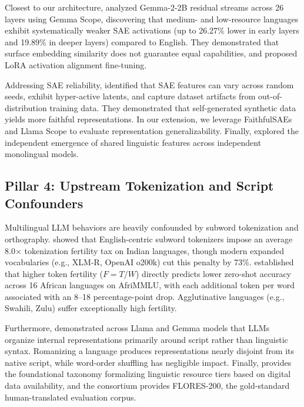 \documentclass[11pt]{article}
\begin{document}
Closest to our architecture, \citet{sin2025uncovering} analyzed Gemma-2-2B residual streams across 26 layers using Gemma Scope, discovering that medium- and low-resource languages exhibit systematically weaker SAE activations (up to 26.27\% lower in early layers and 19.89\% in deeper layers) compared to English. They demonstrated that surface embedding similarity does not guarantee equal capabilities, and proposed LoRA activation alignment fine-tuning.

Addressing SAE reliability, \citet{cho2025faithfulsae} identified that SAE features can vary across random seeds, exhibit hyper-active latents, and capture dataset artifacts from out-of-distribution training data. They demonstrated that self-generated synthetic data yields more faithful representations. In our extension, we leverage FaithfulSAEs and Llama Scope \citep{he2024llama} to evaluate representation generalizability. Finally, \citet{zhou2025extended} explored the independent emergence of shared linguistic features across independent monolingual models.

\subsection{Pillar 4: Upstream Tokenization and Script Confounders}
Multilingual LLM behaviors are heavily confounded by subword tokenization and orthography. \citet{srivastava2026tokenizer} showed that English-centric subword tokenizers impose an average 8.0$\times$ tokenization fertility tax on Indian languages, though modern expanded vocabularies (e.g., XLM-R, OpenAI o200k) cut this penalty by 73\%. \citet{lundin2026token} established that higher token fertility ($F = T/W$) directly predicts lower zero-shot accuracy across 16 African languages on AfriMMLU, with each additional token per word associated with an 8--18 percentage-point drop. Agglutinative languages (e.g., Swahili, Zulu) suffer exceptionally high fertility.

Furthermore, \citet{verma2026multilingual} demonstrated across Llama and Gemma models that LLMs organize internal representations primarily around script rather than linguistic syntax. Romanizing a language produces representations nearly disjoint from its native script, while word-order shuffling has negligible impact. Finally, \citet{joshi2020state} provides the foundational taxonomy formalizing linguistic resource tiers based on digital data availability, and the \citet{nllb2022no} consortium provides FLORES-200, the gold-standard human-translated evaluation corpus.
\end{document}
